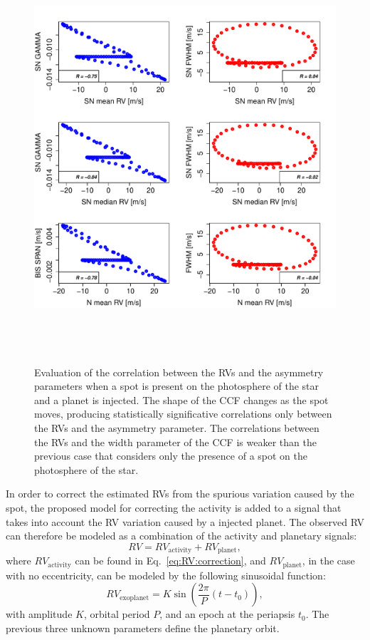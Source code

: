 \documentclass{aa}
\begin{document}
\begin{figure}[htbp]
\begin{center}
\includegraphics[height = 6in]{SOAP_SPOT_PLANET_Comparison_para_SN.pdf} 
   \caption{Evaluation of the correlation between the RVs and the asymmetry parameters when a spot is present on the photosphere of the star and a planet is injected.  The shape of the CCF changes as the spot moves, producing statistically significative correlations only between the RVs and the asymmetry parameter. The correlations between the RVs and the width parameter of the CCF is weaker than the previous case that considers only the presence of a spot on the photosphere of the star.}
    \label{fig:spot.plus.planet.corr}
\end{center}
\end{figure}

In order to correct the estimated RVs from the spurious variation caused by the spot, the proposed model for correcting the activity is added to a signal that takes into account the RV variation caused by a injected planet. The observed RV can therefore be modeled as a combination of the activity and planetary signals:
%
\begin{equation}
RV= RV_{\text{activity}} + RV_{\text{planet}},
\label{eq:RV:correction.overall}
\end{equation}
%
where $RV_{\text{activity}}$ can be found in Eq.~\ref{eq:RV:correction}, and $RV_{\text{planet}}$, in the case with no eccentricity, can be modeled by the following sinusoidal function:
%
\begin{equation}
RV_{\text{exoplanet}}= K \sin \left(\frac{2 \pi}{P} (t - t_{0})\right),
\label{eq:RV:correction.planet}
\end{equation}
%
with amplitude $K$, orbital period $P$, and an epoch at the periapsis $t_{0}$.  The previous three unknown parameters define the planetary orbit.
\end{document}
